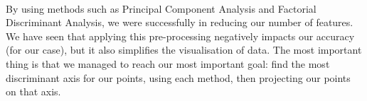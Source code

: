 \paragraph{}
By using methods such as Principal Component Analysis and Factorial Discriminant Analysis, we were successfully in reducing our number of features.
We have seen that applying this pre-processing negatively impacts our accuracy (for our case), but it also simplifies the visualisation of data.
The most important thing is that we managed to reach our most important goal: find the most discriminant axis for our points, using each method, then projecting our points on that axis.